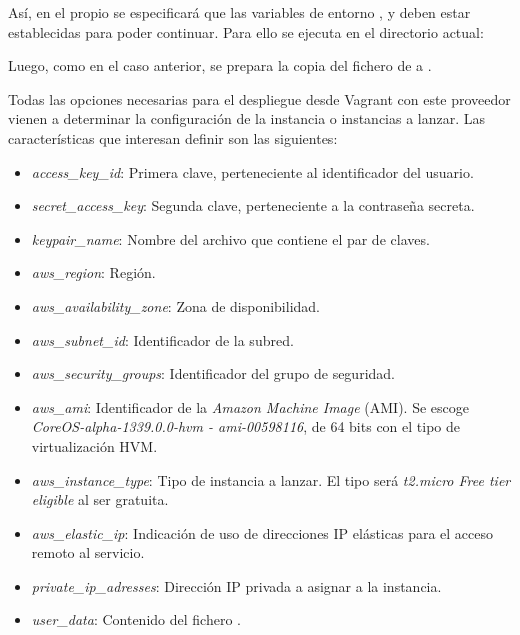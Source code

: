 Así, en el propio  se especificará que las variables de entorno ,  y  deben estar establecidas para poder continuar. Para ello se ejecuta en el directorio actual:


Luego, como en el caso anterior, se prepara la copia del fichero  de  a .

Todas las opciones necesarias para el despliegue desde Vagrant con este proveedor vienen a determinar la configuración de la instancia o instancias a lanzar. Las características que interesan definir son las siguientes:
\begin{itemize}
\item \textit{access\_key\_id}: Primera clave, perteneciente al identificador del usuario.
\item \textit{secret\_access\_key}: Segunda clave, perteneciente a la contraseña secreta.
\item \textit{keypair\_name}: Nombre del archivo que contiene el par de claves.
\item \textit{aws\_region}: Región.
\item \textit{aws\_availability\_zone}: Zona de disponibilidad.
\item \textit{aws\_subnet\_id}: Identificador de la subred.
\item \textit{aws\_security\_groups}: Identificador del grupo de seguridad.
\item \textit{aws\_ami}: Identificador de la \textit{Amazon Machine Image} (AMI). Se escoge \textit{CoreOS-alpha-1339.0.0-hvm - ami-00598116}, de 64 bits con el tipo de virtualización HVM.
\item \textit{aws\_instance\_type}: Tipo de instancia a lanzar. El tipo será \textit{t2.micro Free tier eligible} al ser gratuita.
\item \textit{aws\_elastic\_ip}: Indicación de uso de direcciones IP elásticas para el acceso remoto al servicio.
\item \textit{private\_ip\_adresses}: Dirección IP privada a asignar a la instancia.
\item \textit{user\_data}: Contenido del fichero .
\end{itemize}

